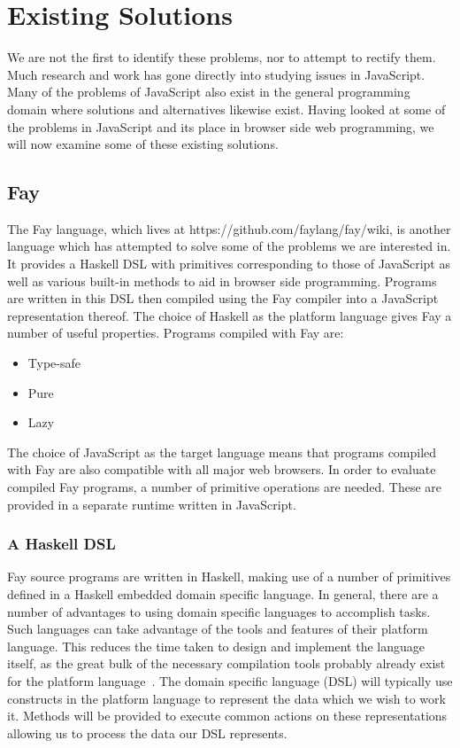 
\section{Existing Solutions}
We are not the first to identify these problems, nor to attempt
to rectify them. Much research and work has gone directly into studying
issues in JavaScript. Many of the problems of JavaScript also exist
in the general programming domain where solutions and alternatives
likewise exist. Having looked at some of the problems in JavaScript 
and its place in browser side web programming, we will now examine
some of these existing solutions.


\subsection{Fay}
The Fay language, which lives at https://github.com/faylang/fay/wiki, is
another language which has attempted to solve some of the problems we
are interested in. It provides a Haskell DSL with primitives corresponding
to those of JavaScript as well as various built-in methods to aid in browser
side programming. Programs are written in this DSL then compiled using the
Fay compiler into a JavaScript representation thereof. The choice of Haskell
as the platform language gives Fay a number of useful properties. Programs 
compiled with Fay are:

\begin{itemize}
	\item Type-safe
	\item Pure
	\item Lazy
\end{itemize}

\noindent The choice of JavaScript as the target language means that programs
compiled with Fay are also compatible with all major web browsers. In order
to evaluate compiled Fay programs, a number of primitive operations
are needed. These are provided in a separate runtime written in JavaScript.

\subsubsection{A Haskell DSL}
Fay source programs are written in Haskell, making use of a number of
primitives defined in a Haskell embedded domain specific language.
In general, there are a number of advantages to using domain specific languages
to accomplish tasks. Such languages can take advantage of the tools and 
features of their platform language. This reduces the time taken to
design and implement the language itself, as the great bulk of the necessary
compilation tools probably already exist for the platform language~\cite{DSLs}. 
The domain specific language (DSL) will typically use constructs in the
platform language to represent the data which we wish to work it. Methods
will be provided to execute common actions on these representations allowing
us to process the data our DSL represents. 

